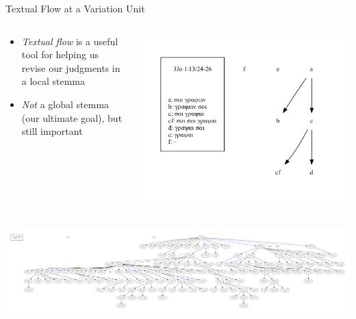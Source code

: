 \documentclass[10pt]{beamer}
\begin{document}
	\begin{frame}{Textual Flow at a Variation Unit}\label{slide:textual-flow-unit}
		\begin{columns}
			\begin{column}{0.45\textwidth}
				\begin{itemize}
					\item \emph{Textual flow} is a useful tool for helping us revise our judgments in a local stemma
					\item \emph{Not} a global stemma (our ultimate goal), but still important
				\end{itemize}
			\end{column}
			\begin{column}{0.45\textwidth}
				\begin{center}
					\includegraphics[width=\textwidth]{../graphics/B25K1V13U24-26-local-stemma-incomplete.pdf}
				\end{center}
			\end{column}
		\end{columns}
		\begin{center}
			\includegraphics[width=\textwidth]{../graphics/B25K1V13U24-26-textual-flow.pdf}
		\end{center}
	\end{frame}
\end{document}
